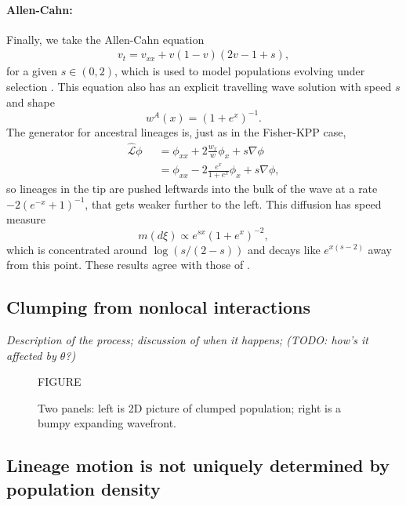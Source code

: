 \documentclass[12pt]{article}
\def \hat{\widehat}
\newcommand{\comment}[1]{{\color{blue} \it #1}}
\begin{document}
\paragraph{Allen-Cahn:}
Finally, we take the Allen-Cahn equation
\begin{align} \label{eqn:allen_cahn}
    v_t = v_{xx} + v(1-v)(2v-1+s),
\end{align}
for a given $s \in (0,2)$,
which is used to model populations evolving under selection \cite{Sarah}.
This equation also has an explicit travelling wave solution with speed $s$
and shape
\[ w^A(x) = (1+e^{x})^{-1}. \]
The generator for ancestral lineages is, just as in the Fisher-KPP case,
\begin{align*}
    \hat{\mathcal{L}}\phi
    &=
    \phi_{xx}
    + 
    2 \frac{w_x}{w} \phi_x
    +
    s \nabla \phi \\
    \qquad &=
    \phi_{xx}
    -
    2 \frac{e^x}{1+e^x} \phi_x 
    + 
    s \nabla \phi,
\end{align*}
so lineages in the tip are pushed leftwards into the bulk of the wave at a rate $-2(e^{-x}+1)^{-1}$,
that gets weaker further to the left.
This diffusion has speed measure
$$
    m(d\xi) \propto e^{sx}(1+e^x)^{-2},
$$
which is concentrated around $\log(s/(2-s))$ and decays like $e^{x(s-2)}$ away from this point.
These results agree with those of \cite{etheridge/penington:2020}.


\subsection{Clumping from nonlocal interactions}

\comment{
    Description of the process;
    discussion of when it happens;
    (TODO: how's it affected by $\theta$?)
}

\begin{figure}
    \begin{center}
        FIGURE
    \end{center}
    \caption{
        Two panels: left is 2D picture of clumped population;
        right is a bumpy expanding wavefront.
        \label{fig:clumping}
    }
\end{figure}


\subsection{Lineage motion is not uniquely determined by population density}
\end{document}
